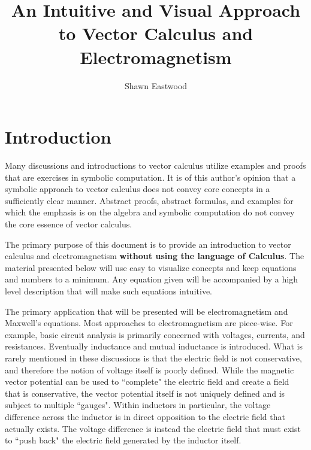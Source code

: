\documentclass{book}
\title{An Intuitive and Visual Approach to Vector Calculus and Electromagnetism}
\author{Shawn Eastwood}
\date{}
\begin{document}
\frontmatter

\maketitle


\chapter*{Introduction}


Many discussions and introductions to vector calculus utilize examples and proofs that are exercises in symbolic computation. It is of this author's opinion that a symbolic approach to vector calculus does not convey core concepts in a sufficiently clear manner. Abstract proofs, abstract formulas, and examples for which the emphasis is on the algebra and symbolic computation do not convey the core essence of vector calculus.  

The primary purpose of this document is to provide an introduction to vector calculus and electromagnetism {\bf without using the language of Calculus}. The material presented below will use easy to visualize concepts and keep equations and numbers to a minimum. Any equation given will be accompanied by a high level description that will make such equations intuitive. 

The primary application that will be presented will be electromagnetism and Maxwell's equations. Most approaches to electromagnetism are piece-wise. For example, basic circuit analysis is primarily concerned with voltages, currents, and resistances. Eventually inductance and mutual inductance is introduced. What is rarely mentioned in these discussions is that the electric field is not conservative, and therefore the notion of voltage itself is poorly defined. While the magnetic vector potential can be used to ``complete" the electric field and create a field that is conservative, the vector potential itself is not uniquely defined and is subject to multiple ``gauges". Within inductors in particular, the voltage difference across the inductor is in direct opposition to the electric field that actually exists. The voltage difference is instead the electric field that must exist to ``push back" the electric field generated by the inductor itself.

\end{document}

